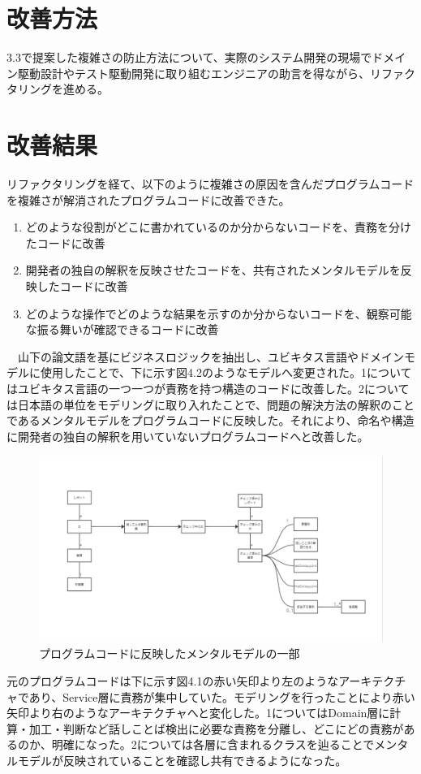 \documentclass[12pt, a4paper]{jreport}
\begin{document}
\section{改善方法}
3.3で提案した複雑さの防止方法について、実際のシステム開発の現場でドメイン駆動設計やテスト駆動開発に取り組むエンジニアの助言を得ながら、リファクタリングを進める。
\section{改善結果}
リファクタリングを経て、以下のように複雑さの原因を含んだプログラムコードを複雑さが解消されたプログラムコードに改善できた。
\begin{enumerate}
\item どのような役割がどこに書かれているのか分からないコードを、責務を分けたコードに改善
\item 開発者の独自の解釈を反映させたコードを、共有されたメンタルモデルを反映したコードに改善
\item どのような操作でどのような結果を示すのか分からないコードを、観察可能な振る舞いが確認できるコードに改善
\end{enumerate}
　山下の論文語を基にビジネスロジックを抽出し、ユビキタス言語やドメインモデルに使用したことで、下に示す図4.2のようなモデルへ変更された。1についてはユビキタス言語の一つ一つが責務を持つ構造のコードに改善した。2については日本語の単位をモデリングに取り入れたことで、問題の解決方法の解釈のことであるメンタルモデルをプログラムコードに反映した。それにより、命名や構造に開発者の独自の解釈を用いていないプログラムコードへと改善した。
\begin{figure}[H]
\centering
\includegraphics[width=1\linewidth]{image/kaizen2.png}
\caption{プログラムコードに反映したメンタルモデルの一部}
\label{fig:enter-label}
\end{figure}
元のプログラムコードは下に示す図4.1の赤い矢印より左のようなアーキテクチャであり、Service層に責務が集中していた。モデリングを行ったことにより赤い矢印より右のようなアーキテクチャへと変化した。1についてはDomain層に計算・加工・判断など話しことば検出に必要な責務を分離し、どこにどの責務があるのか、明確になった。2については各層に含まれるクラスを辿ることでメンタルモデルが反映されていることを確認し共有できるようになった。
\end{document}
